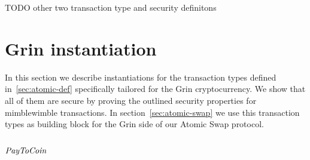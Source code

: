 TODO other two transaction type and security definitons

\section{Grin instantiation}\label{sec:atomic-inst}

In this section we describe instantiations for the transaction types defined in~\ref{sec:atomic-def} specifically tailored for the Grin cryptocurrency. We show that all of them are secure by proving the
outlined security properties for mimblewimble transactions. In section~\ref{sec:atomic-swap} we use this transaction types as building block for the Grin side of our Atomic Swap protocol.\\

\subsection{$\mathit{PayToCoin}$}

